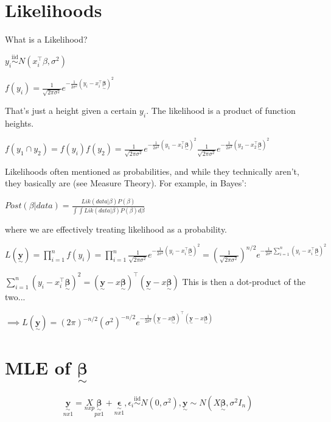 \documentclass{article}
\newcommand{\svec}[1]{\underset{\sim}{\bm{#1}}} %
\newcommand{\xitb}{x_i^{\top}\svec{\beta}}
\let\Oldint=\int
\let\Oldsum=\sum
\let\Oldprod=\prod
\renewcommand{\int}{\Oldint\limits}
\renewcommand{\sum}{\Oldsum\limits}
\renewcommand{\prod}{\Oldprod\limits}
\newcommand{\iiddist}{\overset{\mathrm{iid}}{\sim}}
\begin{document}
\tableofcontents

\newpage

\section{Likelihoods}

What is a Likelihood?

$y_i \iiddist N(x_i^{\top} \beta, \sigma^2)$

$f(y_i) = \frac{1}{\sqrt{2\pi\sigma^2}}e^{-\frac{1}{2\sigma^2}(y_i - x_i^{\top}\svec{\beta})^2}$

That's just a height given a certain $y_i$. The likelihood is a product of function heights. 

$f(y_1 \cap y_2) = f(y_i)f(y_2) = \frac{1}{\sqrt{2\pi\sigma^2}}e^{-\frac{1}{2\sigma^2}(y_1 - x_1^{\top}\svec{\beta})^2}\frac{1}{\sqrt{2\pi\sigma^2}}e^{-\frac{1}{2\sigma^2}(y_2 - x_2^{\top}\svec{\beta})^2}$

Likelihoods often mentioned as probabilities, and while they technically aren't, they basically are (see Measure Theory). For example, in Bayes': 

$Post(\beta|data) = \frac{Lik(data|\beta)P(\beta)}{\int \int Lik(data|\beta)P(\beta)d\beta}$

where we are effectively treating likelihood as a probability. 

$L(\svec{y}) = \prod_{i=1}^n f(y_i) = \prod_{i=1}^n \frac{1}{\sqrt{2\pi\sigma^2}}e^{-\frac{1}{2\sigma^2}(y_i - x_i^{\top}\svec{\beta})^2} = (\frac{1}{\sqrt{2\pi\sigma^2}})^{n/2}e^{-\frac{1}{2\sigma^2}\sum_{i=1}^n(y_i - x_i^{\top}\svec{\beta})^2}$

$\sum_{i=1}^n (y_i - \xitb)^2 = (\svec{y} - x\svec{\beta})^{\top}(\svec{y} - x\svec{\beta})$ This is then a dot-product of the two...

$\implies L(\svec{y}) = (2\pi)^{-n/2}(\sigma^2)^{-n/2} e^{-\frac{1}{2\sigma^2}(\svec{y} - x\svec{\beta})^{\top}(\svec{y} - x\svec{\beta})}$

\section{MLE of $\svec{\beta}$}

$$\underset{nx1}{\svec{y}} = \underset{nxp}{X} \underset{px1}{\svec{\beta}} + \underset{nx1}{\svec{\epsilon}}, \epsilon_i \iiddist N(0, \sigma^2), \svec{y} \sim N(X\svec{\beta}, \sigma^2 I_n)$$
\end{document}
